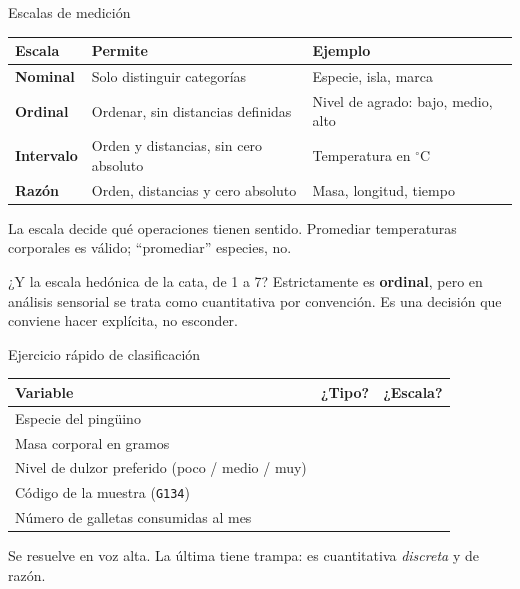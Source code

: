 \documentclass[aspectratio=169,10pt]{beamer}
\newcommand{\destaca}[1]{%
  \par\vspace{3pt}\noindent
  \colorbox{azulClaro}{%
    \parbox{\dimexpr\linewidth-2\fboxsep\relax}{\vspace{3pt}#1\vspace{3pt}}}%
  \par\vspace{3pt}}
\begin{document}
\begin{frame}{Escalas de medición}
  \centering
  {\small
  \begin{tabular}{@{}llp{5.2cm}@{}}
    \toprule
    \textbf{Escala} & \textbf{Permite} & \textbf{Ejemplo} \\
    \midrule
    \textbf{Nominal}   & Solo distinguir categorías & Especie, isla, marca \\
    \textbf{Ordinal}   & Ordenar, sin distancias definidas & Nivel de agrado: bajo, medio, alto \\
    \textbf{Intervalo} & Orden y distancias, sin cero absoluto & Temperatura en $^\circ$C \\
    \textbf{Razón}     & Orden, distancias y cero absoluto & Masa, longitud, tiempo \\
    \bottomrule
  \end{tabular}}

  \vspace{0.6cm}
  \raggedright
  \destaca{La escala decide qué operaciones tienen sentido. Promediar temperaturas
  corporales es válido; ``promediar'' especies, no.

  \vspace{0.2cm}
  ¿Y la escala hedónica de la cata, de 1 a 7? Estrictamente es \textbf{ordinal}, pero
  en análisis sensorial se trata como cuantitativa por convención. Es una decisión
  que conviene hacer explícita, no esconder.}
\end{frame}
\begin{frame}{Ejercicio rápido de clasificación}
  \centering
  {\small
  \begin{tabular}{@{}lcc@{}}
    \toprule
    \textbf{Variable} & \textbf{¿Tipo?} & \textbf{¿Escala?} \\
    \midrule
    Especie del pingüino & & \\[6pt]
    Masa corporal en gramos & & \\[6pt]
    Nivel de dulzor preferido (poco / medio / muy) & & \\[6pt]
    Código de la muestra (\texttt{G134}) & & \\[6pt]
    Número de galletas consumidas al mes & & \\
    \bottomrule
  \end{tabular}}

  \vspace{0.7cm}
  \raggedright
  {\footnotesize Se resuelve en voz alta. La última tiene trampa: es cuantitativa
  \emph{discreta} y de razón.}
\end{frame}
\end{document}

